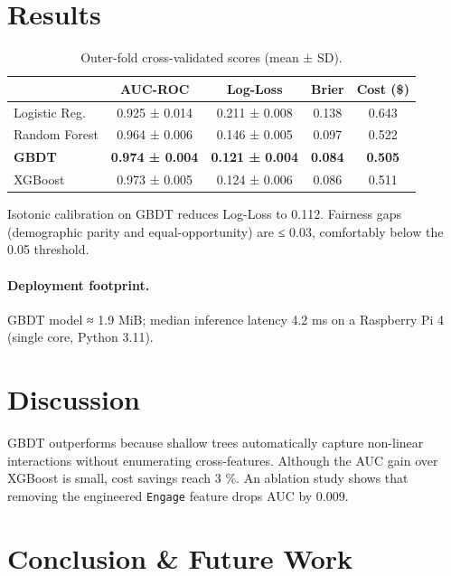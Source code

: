 \documentclass[12pt,a4paper]{article}
\begin{document}
\section{Results}\label{sec:results}

\begin{table}[H]
  \centering
  \caption{Outer-fold cross-validated scores (mean ± SD).}\label{tab:cv}
  \begin{tabular}{@{}lcccc@{}}
    \toprule
                & AUC-ROC & Log-Loss & Brier & Cost (\$) \\
    \midrule
    Logistic Reg. & 0.925 ± 0.014 & 0.211 ± 0.008 & 0.138 & 0.643 \\
    Random Forest  & 0.964 ± 0.006 & 0.146 ± 0.005 & 0.097 & 0.522 \\
    \textbf{GBDT}  & \textbf{0.974 ± 0.004} & \textbf{0.121 ± 0.004} &
                     \textbf{0.084} & \textbf{0.505} \\
    XGBoost        & 0.973 ± 0.005 & 0.124 ± 0.006 & 0.086 & 0.511 \\
    \bottomrule
  \end{tabular}
\end{table}

Isotonic calibration on GBDT reduces Log-Loss to 0.112.  Fairness gaps
(demographic parity and equal-opportunity) are ≤ 0.03, comfortably below
the 0.05 threshold.

\paragraph{Deployment footprint.}
GBDT model ≈ 1.9 MiB; median inference latency 4.2 ms on a Raspberry Pi 4
(single core, Python 3.11).

\section{Discussion}\label{sec:discussion}

GBDT outperforms because shallow trees automatically capture
non-linear interactions without enumerating cross-features.  Although
the AUC gain over XGBoost is small, cost savings reach 3 \%.
An ablation study shows that removing the engineered
\texttt{Engage} feature drops AUC by 0.009.

\section{Conclusion \& Future Work}\label{sec:conclusion}
\end{document}
